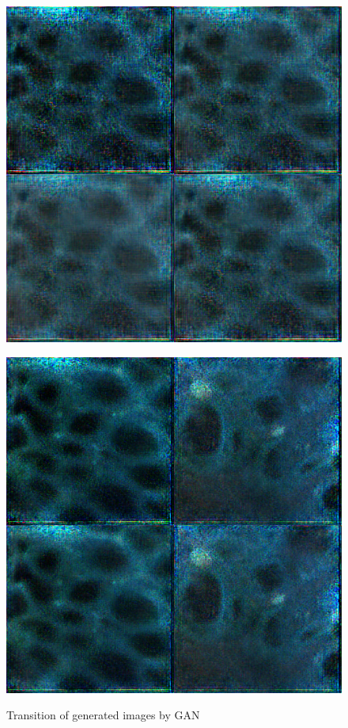 \begin{figure}[H]
\begin{minipage}{0.24\columnwidth}
		\label{fig:}
	\end{minipage}
	\begin{minipage}{0.24\columnwidth}
		\centering
		\includegraphics[clip, width=\linewidth]{fig/generative_adversarial_nets/2004_0000}
		\label{fig:}
	\end{minipage}
	\begin{minipage}{0.24\columnwidth}
		\centering
		\includegraphics[clip, width=\linewidth]{fig/generative_adversarial_nets/3208_0000}
		\label{fig:}
	\end{minipage}
	
	\caption{Transition of generated images by GAN}
	\label{fig:GANimage}
	
\end{figure}

